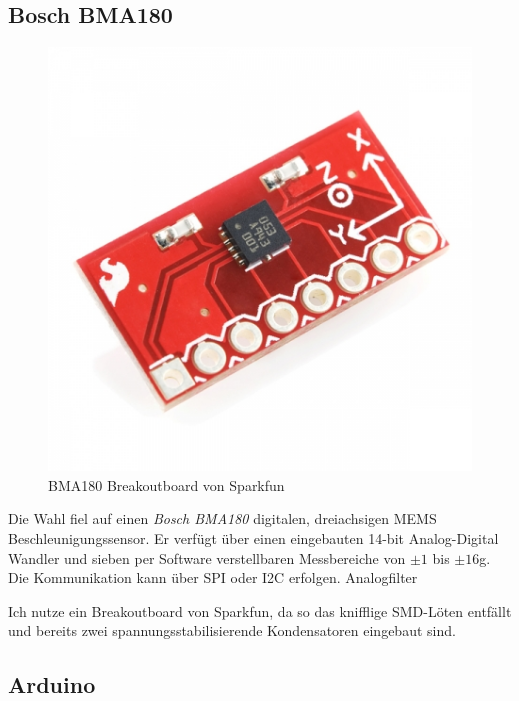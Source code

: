 \documentclass[12pt,a4paper]{scrartcl}
\begin{document}
\subsection{Bosch BMA180}
\begin{figure}[h]
\centering
\includegraphics[scale=.4]{hardwareimages/bma180_breakout.jpg}
\caption{BMA180 Breakoutboard von Sparkfun}
\label{bma180_breakout}
\end{figure}

Die Wahl fiel auf einen \textit{Bosch BMA180} digitalen, dreiachsigen MEMS Beschleunigungssensor. Er verfügt über einen eingebauten 14-bit Analog-Digital Wandler und sieben per Software verstellbaren Messbereiche von $\pm1$ bis $\pm16$g.
Die Kommunikation kann über SPI oder I2C erfolgen.
Analogfilter

Ich nutze ein Breakoutboard von Sparkfun, da so das knifflige SMD-Löten entfällt und bereits zwei spannungsstabilisierende Kondensatoren eingebaut sind.

\subsection{Arduino}
\end{document}
